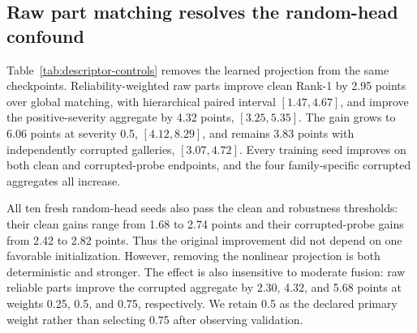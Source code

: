 \documentclass[runningheads]{llncs}
\begin{document}
\subsection{Raw part matching resolves the random-head confound}

\begin{table}[!t]
\centering
\caption{Checkpoint-only descriptor controls on CASIA-B validation Rank-1
(\%). All conditions use the same three selected metric-baseline backbones and
the fixed 0.5 fusion weight. ``Fresh random heads'' is the mean across ten
projection seeds; brackets give the range after averaging the three backbone
seeds. No control retrains the backbone or local head.}
\label{tab:descriptor-controls}
\small
\setlength{\tabcolsep}{3.5pt}
\end{table}

Table~\ref{tab:descriptor-controls} removes the learned projection from the
same checkpoints. Reliability-weighted raw parts improve clean Rank-1 by 2.95
points over global matching, with hierarchical paired interval
$[1.47,4.67]$, and improve the positive-severity aggregate by 4.32 points,
$[3.25,5.35]$. The gain grows to 6.06 points at severity 0.5,
$[4.12,8.29]$, and remains 3.83 points with independently corrupted galleries,
$[3.07,4.72]$. Every training seed improves on both clean and corrupted-probe
endpoints, and the four family-specific corrupted aggregates all increase.

All ten fresh random-head seeds also pass the clean and robustness thresholds:
their clean gains range from 1.68 to 2.74 points and their corrupted-probe gains
from 2.42 to 2.82 points. Thus the original improvement did not depend on one
favorable initialization. However, removing the nonlinear projection is both
deterministic and stronger. The effect is also insensitive to moderate fusion:
raw reliable parts improve the corrupted aggregate by 2.30, 4.32, and 5.68
points at weights 0.25, 0.5, and 0.75, respectively. We retain 0.5 as the
declared primary weight rather than selecting 0.75 after observing validation.
\end{document}
